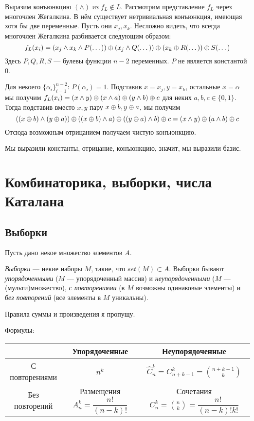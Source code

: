 \documentclass[a4paper]{report}
\begin{document}
{{{                \item Выразим конъюнкцию $(\land)$ из $f_L \notin L$.
                Рассмотрим представление $f_L$ через многочлен Жегалкина.
                В нём существует нетривиальная конъюнкция, имеющая хотя бы две переменные.
                Пусть они $x_j, x_k$.
                Несложно видеть, что всегда многочлен Жегалкина разбивается следующим образом: \[f_L(x_i) = \left(x_j \land x_k \land P(\dots)\right) \oplus \left(x_j \land Q(\dots)\right) \oplus \left(x_k \oplus R(\dots)\right) \oplus S(\dots)\] Здесь $P, Q, R, S$ --- булевы функции $n - 2$ переменных. $P$ не является константой $0$.

                Для некоего $\{\alpha_i\}_{i = 1}^{n-2}$: $P(\alpha_i) = 1$.
                Подставив $x = x_j, y = x_k$, остальные $x = \alpha$ мы получим $f_L(x_i) = (x \land y) \oplus (x \land a) \oplus (y \land b) \oplus c$ для неких $a, b, c \in \{0, 1\}$.
                Тогда подставив вместо $x, y$ пару $x \oplus b, y \oplus a$, мы получим \[\left((x \oplus b) \land (y \oplus a)\right) \oplus \left((x \oplus b) \land a\right) \oplus \left((y \oplus a) \land b\right) \oplus c = (x \land y) \oplus (a \land b) \oplus c\] Отсюда возможным отрицанием получаем чистую конъюнкцию.

            }
            Мы выразили константы, отрицание, конъюнкцию, значит, мы выразили базис.
        }
    }


    \chapter{Комбинаторика, выборки, числа Каталана}


    \section{Выборки}

    Пусть дано некое множество элементов $A$.

    \textit{Выборки} --- некие наборы $M$, такие, что $set(M) \subset A$.
    Выборки бывают \textit{упорядоченными} ($M$ --- упорядоченный массив) и \textit{неупорядоченными} ($M$ --- (мульти)множество), \textit{с повторениями} (в $M$ возможны одинаковые элементы) и \textit{без повторений} (все элементы в $M$ уникальны).

    Правила суммы и произведения я пропущу.

    Формулы:

    \begin{tabular}{| c | c | c |}
        \hline
        & Упорядоченные                           & Неупорядоченные                                         \\
        \hline
        С повторениями & $n^k$                                   & $\hat{C}_n^{k} = C_{n + k - 1}^{k} = \binom{n+k-1}{k}$  \\
        \hline
        Без повторений & Размещения $A_n^k = \dfrac{n!}{(n-k)!}$ & Сочетания $C_n^k = \binom{n}{k} = \dfrac{n!}{(n-k)!k!}$ \\
        \hline
    \end{tabular}
\end{document}
